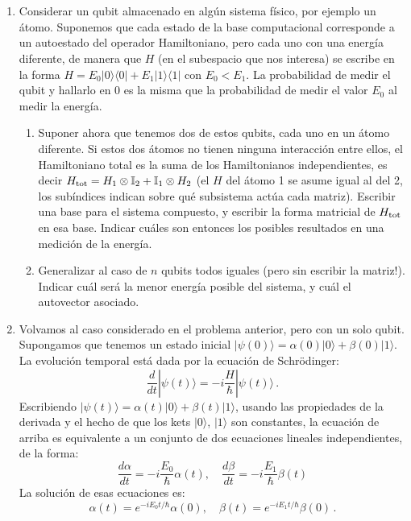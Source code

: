 \documentclass[a4paper,11pt,spanish]{article}
\newcommand{\ket}[1]{|#1\rangle}
\newcommand{\bra}[1]{\langle #1|}
\newcommand{\ketbra}[2]{\ket{#1}\bra{#2}}
\newcommand{\proj}[1]{\ketbra {#1}{#1}}
\begin{document}
\\

\\

\vspace{10pt}


\begin{enumerate}
\item Considerar un qubit almacenado en alg\'un sistema f\'isico, por ejemplo un \'atomo. Suponemos que cada estado de la base computacional corresponde a un autoestado del operador Hamiltoniano, pero cada uno con una energ\'ia diferente, de manera que $H$ (en el subespacio que nos interesa) se escribe en la forma $H=E_0 \proj{0}+E_1\proj{1}$ con $E_0< E_1$. La probabilidad de medir el qubit y hallarlo en 0 es la misma que la probabilidad de medir el valor $E_0$ al medir la energ\'ia.

\begin{enumerate}
 \item Suponer ahora que tenemos dos de estos qubits, cada uno en un \'atomo diferente. Si estos dos \'atomos no tienen ninguna interacci\'on entre ellos, el Hamiltoniano total es la suma de los Hamiltonianos independientes, es decir $H_{\rm tot} = H_1\otimes \mathbb{I}_2+ \mathbb{I}_1 \otimes H_2$ (el $H$ del \'atomo 1 se asume igual al del 2, los sub\'indices indican sobre qu\'e subsistema act\'ua cada matriz). Escribir una base para el sistema compuesto, y escribir la forma matricial de $H_{\rm tot}$ en esa base. Indicar cu\'ales son entonces los posibles resultados en una medici\'on de la energ\'ia.

 \item Generalizar al caso de $n$ qubits todos iguales (\textexclamdown pero sin escribir la matriz!). Indicar cu\'al ser\'a la menor energ\'ia posible del sistema, y cu\'al el autovector asociado.
\end{enumerate}
 
\item Volvamos al caso considerado en el problema anterior, pero con un solo qubit. Supongamos que tenemos un estado inicial $\ket{\psi(0)} = \alpha(0) \ket{0}+\beta(0) \ket{1}$. La evoluci\'on temporal est\'a dada por la ecuaci\'on de Schr\"odinger:
$$\frac{d}{dt} \ket{\psi(t)} = - i \frac{H}{\hbar} \ket{\psi(t)}\,.$$ 
Escribiendo $\ket{\psi(t)}= \alpha(t) \ket{0}+\beta(t) \ket{1}$, usando las propiedades de la derivada y el hecho de que los kets $\ket{0}$, $\ket{1}$ son constantes, la ecuaci\'on de arriba es equivalente a un conjunto de dos ecuaciones lineales independientes, de la forma:
 $$\frac{d\alpha}{dt} = -i \frac{E_0}{\hbar} \alpha(t), \quad \frac{d\beta}{dt} = -i \frac{E_1}{\hbar} \beta(t)$$
La soluci\'on de esas ecuaciones es: 
$$\alpha(t) = e^{-iE_0 t/\hbar} \alpha(0), \quad \beta(t) = e^{-iE_1 t/\hbar} \beta(0)\,.$$



\end{enumerate}
\end{document}
